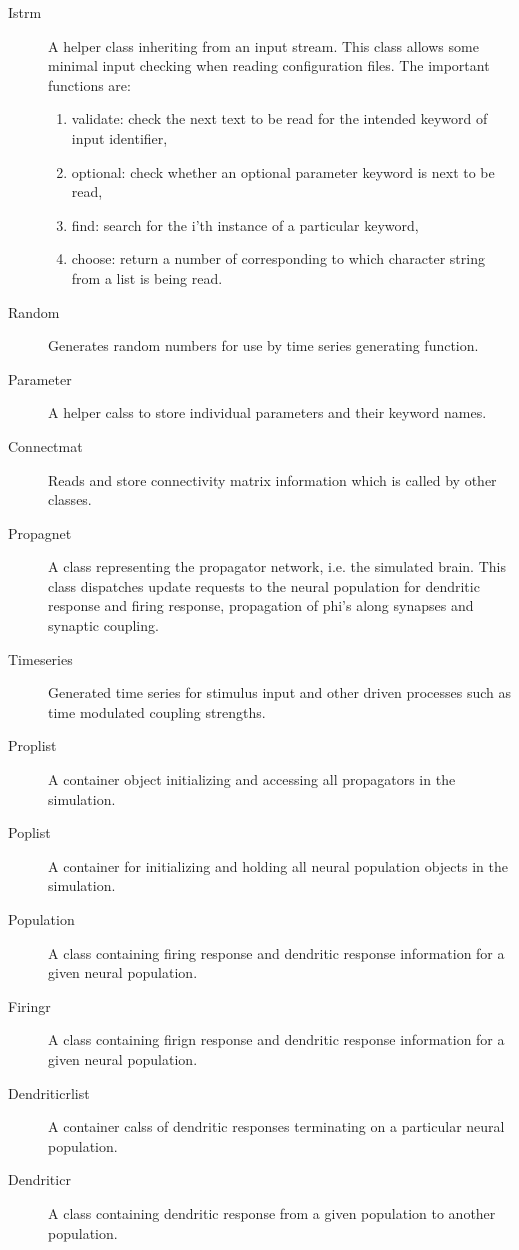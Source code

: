 \documentclass[12pt,a4paper]{article}
\begin{document}
\begin{description}
\item[Istrm] A helper class inheriting from an input stream. This class allows some minimal input checking when reading configuration files. The important functions are:
	\begin{enumerate}
	\item validate: check the next text to be read for the intended keyword of input identifier,
	\item optional: check whether an optional parameter keyword is next to be read,
	\item find: search for the i'th instance of a particular keyword,
	\item choose: return a number of corresponding to which character string from a list is being read.
	\end{enumerate}
\item[Random] Generates random numbers for use by time series generating function.
\item[Parameter] A helper calss to store individual parameters and their keyword names.
\item[Connectmat] Reads and store connectivity matrix information which is called by other classes.
\item[Propagnet] A class representing the propagator network, i.e. the simulated brain. This class dispatches update requests to the neural population for dendritic response and firing response, propagation of phi's along synapses and synaptic coupling.
\item[Timeseries] Generated time series for stimulus input and other driven processes such as time modulated coupling strengths.
\item[Proplist] A container object initializing and accessing all propagators in the simulation.
\item[Poplist] A container for initializing and holding all neural population objects in the simulation.
\item[Population] A class containing firing response and dendritic response information for a given neural population.
\item[Firingr] A class containing firign response and dendritic response information for a given neural population.
\item[Dendriticrlist] A container calss of dendritic responses terminating on a particular neural population.
\item[Dendriticr] A class containing dendritic response from a given population to another population.

\end{description}
\end{document}
